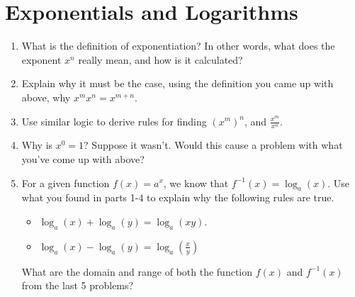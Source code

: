 \documentclass[11pt]{article}
\begin{document}
\section*{Exponentials and Logarithms}
\begin{enumerate}
\item What is the definition of exponentiation? In other words, what does the exponent $x^n$ really mean, and how is it calculated?
\item Explain why it must be the case, using the definition you came up with above, why $x^mx^n = x^{m+n}$.
\item Use similar logic to derive rules for finding $(x^m)^n$, and $\frac{x^m}{x^n}$.
\item Why is $x^0 = 1$? Suppose it wasn't. Would this cause a problem with what you've come up with above?
\item For a given function $f(x) = a^x$, we know that $f^{-1}(x) = \log_a(x)$. Use what you found in parts 1-4 to explain why the following rules are true.
\begin{itemize}
\item $\log_a(x) + \log_a(y) = \log_a(xy)$.
\item $\log_a(x) - \log_a(y) = \log_a(\frac{x}{y})$
\end{itemize}
What are the domain and range of both the function $f(x)$ and $f^{-1}(x)$ from the last 5 problems?
\end{enumerate}
\end{document}
